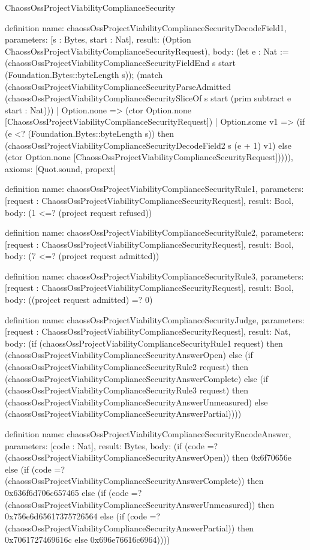 \begin{lexlean}{ChaossOssProjectViabilityComplianceSecurity}
\begin{semanticmodule}
definition{
  name: chaossOssProjectViabilityComplianceSecurityDecodeField1,
  parameters: [s : Bytes, start : Nat],
  result: (Option ChaossOssProjectViabilityComplianceSecurityRequest),
  body: (let e : Nat := (chaossOssProjectViabilityComplianceSecurityFieldEnd s start (Foundation.Bytes::byteLength s)); (match (chaossOssProjectViabilityComplianceSecurityParseAdmitted (chaossOssProjectViabilityComplianceSecuritySliceOf s start (prim subtract e start : Nat)))
    | Option.none => (ctor Option.none [ChaossOssProjectViabilityComplianceSecurityRequest])
    | Option.some v1 => (if (e <? (Foundation.Bytes::byteLength s)) then (chaossOssProjectViabilityComplianceSecurityDecodeField2 s (e + 1) v1) else (ctor Option.none [ChaossOssProjectViabilityComplianceSecurityRequest])))),
  axioms: [Quot.sound, propext]
}

definition{
  name: chaossOssProjectViabilityComplianceSecurityRule1,
  parameters: [request : ChaossOssProjectViabilityComplianceSecurityRequest],
  result: Bool,
  body: (1 <=? (project request refused))
}

definition{
  name: chaossOssProjectViabilityComplianceSecurityRule2,
  parameters: [request : ChaossOssProjectViabilityComplianceSecurityRequest],
  result: Bool,
  body: (7 <=? (project request admitted))
}

definition{
  name: chaossOssProjectViabilityComplianceSecurityRule3,
  parameters: [request : ChaossOssProjectViabilityComplianceSecurityRequest],
  result: Bool,
  body: ((project request admitted) =? 0)
}

definition{
  name: chaossOssProjectViabilityComplianceSecurityJudge,
  parameters: [request : ChaossOssProjectViabilityComplianceSecurityRequest],
  result: Nat,
  body: (if (chaossOssProjectViabilityComplianceSecurityRule1 request) then (chaossOssProjectViabilityComplianceSecurityAnswerOpen) else (if (chaossOssProjectViabilityComplianceSecurityRule2 request) then (chaossOssProjectViabilityComplianceSecurityAnswerComplete) else (if (chaossOssProjectViabilityComplianceSecurityRule3 request) then (chaossOssProjectViabilityComplianceSecurityAnswerUnmeasured) else (chaossOssProjectViabilityComplianceSecurityAnswerPartial))))
}

definition{
  name: chaossOssProjectViabilityComplianceSecurityEncodeAnswer,
  parameters: [code : Nat],
  result: Bytes,
  body: (if (code =? (chaossOssProjectViabilityComplianceSecurityAnswerOpen)) then 0x6f70656e else (if (code =? (chaossOssProjectViabilityComplianceSecurityAnswerComplete)) then 0x636f6d706c657465 else (if (code =? (chaossOssProjectViabilityComplianceSecurityAnswerUnmeasured)) then 0x756e6d65617375726564 else (if (code =? (chaossOssProjectViabilityComplianceSecurityAnswerPartial)) then 0x7061727469616c else 0x696e76616c6964))))
}


\end{semanticmodule}
\end{lexlean}
